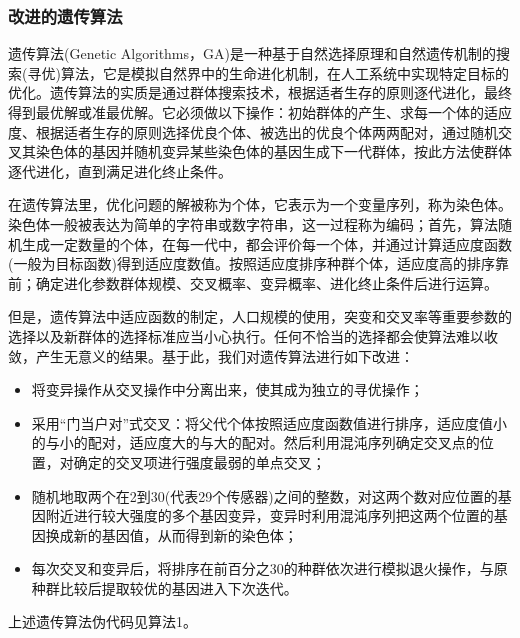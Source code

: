 \documentclass[withoutpreface,bwprint]{cumcmthesis} %
\begin{document}
\subsubsection{改进的遗传算法}
遗传算法(Genetic Algorithms，GA)是一种基于自然选择原理和自然遗传机制的搜索(寻优)算法，它是模拟自然界中的生命进化机制，在人工系统中实现特定目标的优化。遗传算法的实质是通过群体搜索技术，根据适者生存的原则逐代进化，最终得到最优解或准最优解。它必须做以下操作：初始群体的产生、求每一个体的适应度、根据适者生存的原则选择优良个体、被选出的优良个体两两配对，通过随机交叉其染色体的基因并随机变异某些染色体的基因生成下一代群体，按此方法使群体逐代进化，直到满足进化终止条件。\par
在遗传算法里，优化问题的解被称为个体，它表示为一个变量序列，称为染色体。染色体一般被表达为简单的字符串或数字符串，这一过程称为编码；首先，算法随机生成一定数量的个体，在每一代中，都会评价每一个体，并通过计算适应度函数(一般为目标函数)得到适应度数值。按照适应度排序种群个体，适应度高的排序靠前；确定进化参数群体规模、交叉概率、变异概率、进化终止条件后进行运算。\par
但是，遗传算法中适应函数的制定，人口规模的使用，突变和交叉率等重要参数的选择以及新群体的选择标准应当小心执行。任何不恰当的选择都会使算法难以收敛，产生无意义的结果。基于此，我们对遗传算法进行如下改进：\par
\begin{itemize}
\item 将变异操作从交叉操作中分离出来，使其成为独立的寻优操作；
\item 采用“门当户对”式交叉：将父代个体按照适应度函数值进行排序，适应度值小的与小的配对，适应度大的与大的配对。然后利用混沌序列确定交叉点的位置，对确定的交叉项进行强度最弱的单点交叉；
\item 随机地取两个在2到30(代表29个传感器)之间的整数，对这两个数对应位置的基因附近进行较大强度的多个基因变异，变异时利用混沌序列把这两个位置的基因换成新的基因值，从而得到新的染色体；
\item 每次交叉和变异后，将排序在前百分之30的种群依次进行模拟退火操作，与原种群比较后提取较优的基因进入下次迭代。
\end{itemize}
上述遗传算法伪代码见算法1。\par
\end{document}
